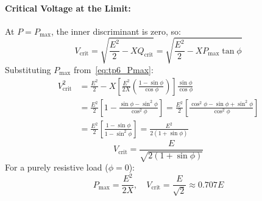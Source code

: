 \paragraph{Critical Voltage at the Limit:}
At $P = P_{\text{max}}$, the inner discriminant is zero, so:
\begin{equation}
    V_{\text{crit}} = \sqrt{\frac{E^2}{2} - X Q_{\text{crit}}} = \sqrt{\frac{E^2}{2} - X P_{\text{max}}\tan\phi}
\end{equation}
Substituting $P_{\text{max}}$ from~\eqref{eq:tp6_Pmax}:
\begin{align}
    V_{\text{crit}}^2 &= \frac{E^2}{2} - X \left[\frac{E^2}{2X}\left(\frac{1 - \sin\phi}{\cos\phi}\right)\right] \frac{\sin\phi}{\cos\phi} \nonumber\\
                     &= \frac{E^2}{2} \left[ 1 - \frac{\sin\phi - \sin^2\phi}{\cos^2\phi} \right] = \frac{E^2}{2} \left[ \frac{\cos^2\phi - \sin\phi + \sin^2\phi}{\cos^2\phi} \right] \nonumber\\
                     &= \frac{E^2}{2} \left[ \frac{1 - \sin\phi}{1 - \sin^2\phi} \right] = \frac{E^2}{2(1 + \sin\phi)}
\end{align}
\begin{equation}
    \boxed{V_{\text{crit}} = \frac{E}{\sqrt{2(1 + \sin\phi)}}}
\end{equation}
For a purely resistive load ($\phi = 0$):
\[
P_{\text{max}} = \frac{E^2}{2X}, \quad V_{\text{crit}} = \frac{E}{\sqrt{2}} \approx 0.707 E
\]

